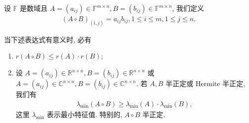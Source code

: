 \documentclass[../../main.tex]{subfiles}%
\begin{document}
\begin{definition}[矩阵的Hadamard积]
设 $\mathbb{F}$ 是数域且 $A=(a_{ij})\in\mathbb{F}^{m\times n}, B=(b_{ij})\in\mathbb{F}^{m\times n}$, 我们定义
\begin{align*}
(A\circ B)_{(i,j)}=a_{ij}b_{ij}, 1\leqslant i\leqslant m, 1\leqslant j\leqslant n.
\end{align*}
\end{definition}

\begin{theorem}[矩阵的Hadamard积的性质]
当下述表达式有意义时, 必有
\begin{enumerate}
\item $r(A\circ B)\leqslant r(A)\cdot r(B)$;

\item 设 $A=(a_{ij})\in\mathbb{R}^{n\times n}, B=(b_{ij})\in\mathbb{R}^{n\times n}$ 或 $A=(a_{ij})\in\mathbb{C}^{n\times n}, B=(b_{ij})\in\mathbb{C}^{n\times n}$. 若 $A,B$ 半正定或 Hermite 半正定, 我们有
\begin{align*}
\lambda_{\min}(A\circ B)\geqslant \lambda_{\min}(A)\cdot\lambda_{\min}(B),
\end{align*}
这里 $\lambda_{\min}$ 表示最小特征值. 特别的, $A\circ B$ 半正定.
\end{enumerate}
\end{theorem}
\end{document}
